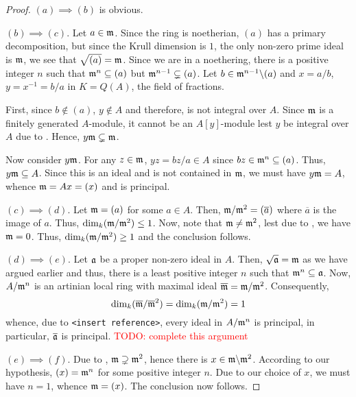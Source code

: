 \begin{proof}
    $(a)\implies(b)$ is obvious. 

    $(b)\implies(c)$. Let $a\in\mathfrak m$. Since the ring is noetherian, $(a)$ has a primary decomposition, but since the Krull dimension is $1$, the only non-zero prime ideal is $\mathfrak m$, we see that $\sqrt{(a)} = \mathfrak m$. Since we are in a noethering, there is a positive integer $n$ such that $\mathfrak m^n\subseteq (a)$ but $\mathfrak m^{n - 1}\subsetneq(a)$. Let $b\in\mathfrak m^{n - 1}\backslash(a)$ and $x = a/b$, $y = x^{-1} = b/a$ in $K = Q(A)$, the field of fractions. 

    First, since $b\notin(a)$, $y\notin A$ and therefore, is not integral over $A$. Since $\mathfrak m$ is a finitely generated $A$-module, it cannot be an $A[y]$-module lest $y$ be integral over $A$ due to . Hence, $y\mathfrak m\subsetneq\mathfrak m$.

    Now consider $y\mathfrak m$. For any $z\in\mathfrak m$, $yz = bz/a\in A$ since $bz\in\mathfrak m^n\subseteq(a)$. Thus, $y\mathfrak m\subseteq A$. Since this is an ideal and is not contained in $\mathfrak m$, we must have $y\mathfrak m = A$, whence $\mathfrak m = Ax = (x)$ and is principal. 

    $(c)\implies(d)$. Let $\mathfrak m = (a)$ for some $a\in A$. Then, $\mathfrak m/\mathfrak m^2 = (\overline a)$ where $\overline a$ is the image of $a$. Thus, $\dim_k(\mathfrak m/\mathfrak m^2)\le 1$. Now, note that $\mathfrak m\ne\mathfrak m^2$, lest due to , we have $\mathfrak m = 0$. Thus, $\dim_k(\mathfrak m/\mathfrak m^2)\ge 1$ and the conclusion follows.

    $(d)\implies(e)$. Let $\mathfrak a$ be a proper non-zero ideal in $A$. Then, $\sqrt{\mathfrak a} = \mathfrak m$ as we have argued earlier and thus, there is a least positive integer $n$ such that $\mathfrak m^n\subseteq\mathfrak a$. Now, $A/\mathfrak m^n$ is an artinian local ring with maximal ideal $\overline{\mathfrak m} = \mathfrak m/\mathfrak m^2$. Consequently, 
    \begin{equation*}
        \dim_k(\overline{\mathfrak m}/\overline{\mathfrak m}^2) = \dim_k(\mathfrak m/\mathfrak m^2) = 1
    \end{equation*}
    whence, due to \texttt{<insert reference>}, every ideal in $A/\mathfrak m^n$ is principal, in particular, $\overline{\mathfrak a}$ is principal. \textcolor{red}{TODO: complete this argument}

    $(e)\implies(f)$. Due to , $\mathfrak m\supsetneq\mathfrak m^2$, hence there is $x\in\mathfrak m\backslash\mathfrak m^2$. According to our hypothesis, $(x) = \mathfrak m^n$ for some positive integer $n$. Due to our choice of $x$, we must have $n = 1$, whence $\mathfrak m = (x)$. The conclusion now follows. 


\end{proof}
